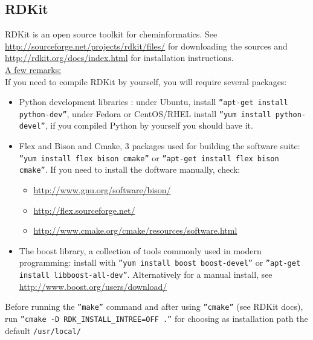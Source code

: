 \documentclass[11pt,a4paper]{article}
\begin{document}
\subsection{RDKit}
RDKit is an open source toolkit for cheminformatics. See 
\href{http://sourceforge.net/projects/rdkit/files/}{http://sourceforge.net/projects/rdkit/files/}
for downloading the sources and 
\href{http://rdkit.org/docs/index.html}{http://rdkit.org/docs/index.html}
for installation instructions.\\

\underline{A few remarks:}\\

If you need to compile RDKit by yourself, you will require several packages:
\begin{itemize}
\item Python development libraries : under Ubuntu, install 
\texttt{''apt-get install python-dev''}, 
under Fedora or CentOS/RHEL install \texttt{''yum install python-devel''}, if 
you compiled 
Python by yourself you should have it.

\item Flex and Bison and Cmake, 3 packages used for building the software suite:
\texttt{''yum install flex bison cmake''} or \texttt{''apt-get install flex 
bison cmake''}. If you need to install the doftware manually, check:
\begin{itemize}
\item 
\href{http://www.gnu.org/software/bison/}{http://www.gnu.org/software/bison/}
\item \href{http://flex.sourceforge.net/}{http://flex.sourceforge.net/}
\item 
\href{http://www.cmake.org/cmake/resources/software.html}{http://www.cmake.org/cmake/resources/software.html}
\end{itemize}

\item The boost library, a collection of tools commonly used in modern 
programming: install with \texttt{''yum install boost boost-devel''}
or \texttt{''apt-get install libboost-all-dev''}. Alternatively for a manual 
install, see 
\href{http://www.boost.org/users/download/}{http://www.boost.org/users/download/}
\end{itemize}


Before running the \texttt{''make''} command and after using 
\texttt{''cmake''} (see 
RDKit docs), run \texttt{''cmake -D RDK\_INSTALL\_INTREE=OFF .''} for 
choosing as installation path the default \texttt{/usr/local/}\\
\end{document}
